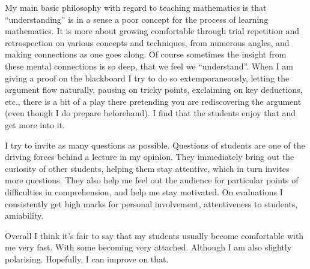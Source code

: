 \documentclass{amsart}
\begin{document}
My main basic philosophy with regard
to teaching mathematics is that ``understanding'' is in a sense
a poor concept for the process of learning mathematics. It is more about growing comfortable through trial repetition and retrospection on various concepts and techniques, from numerous angles,
and making connections as one goes along. 
Of course sometimes the insight
from these mental connections is so deep, that we feel we ``understand''. When I am giving a proof on the blackboard I try to do so extemporaneously, letting the argument flow naturally, pausing on tricky points, exclaiming on key deductions, etc., there is a bit of a play there pretending you are rediscovering the argument (even though I do prepare beforehand).
I find that the students enjoy that and get more into it. 

I try to invite as many questions as possible. Questions of
students are one of the driving forces behind a lecture in my opinion. They
immediately bring out the curiosity of other students, helping
them stay attentive, which in turn invites more questions. They also help me
feel out the audience for particular points of difficulties in comprehension, and
help me stay motivated. On evaluations I consistently get high marks for personal involvement, attentiveness to students, amiability.

%  
Overall I think it's fair to say that my students usually become comfortable
with me very fast. With some becoming very attached. Although I am also
slightly polarising. Hopefully, I can improve on that.
\end{document}
